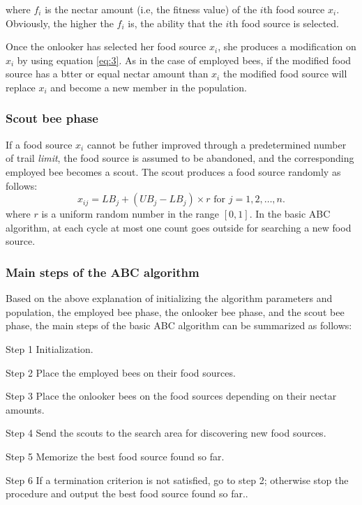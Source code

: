 \documentclass[pdftex,11pt]{article}
\begin{document}
where $f_i$ is the nectar amount (i.e, the fitness value) of the $i$th food source $x_i$. Obviously, the higher the $f_i$ is, the ability that the $i$th food source is selected.

Once the onlooker has selected her food source $x_i$, she produces a modification on $x_i$ by using equation \ref{eq:3}. As in the case of employed bees, if the modified food source has a btter or equal nectar amount than $x_i$ the modified food source will replace $x_i$ and become a new member in the population.

\subsubsection{Scout bee phase}
If a food source $x_i$ cannot be futher improved through a predetermined number of trail \emph{limit}, the food source is assumed to be abandoned, and the corresponding employed bee becomes a scout. The scout produces a food source randomly as follows:
\begin{equation}
	x_{ij} = LB_j + (UB_j - LB_j) \times r \text{ for $j = 1,2,\dots,n.$}
\end{equation}
where $r$ is a uniform random number in the range $[0,1]$.
In the basic ABC algorithm, at each cycle at most one count goes outside for searching a new food source.
\subsubsection{Main steps of the ABC algorithm}
Based on the above explanation of initializing the algorithm parameters and population, the employed bee phase, the onlooker bee phase, and the scout bee phase, the main steps of the basic ABC algorithm can be summarized as follows:

\begin{description}
	\item{Step 1} Initialization.
	\item{Step 2} Place the employed bees on their food sources.
	\item{Step 3} Place the onlooker bees on the food sources depending on their nectar amounts.
	\item{Step 4} Send the scouts to the search area for discovering new food sources.
	\item{Step 5} Memorize the best food source found so far.
	\item{Step 6} If a termination criterion is not satisfied, go to step 2; otherwise stop the procedure and output the best food source found so far..
\end{description}
\end{document}
